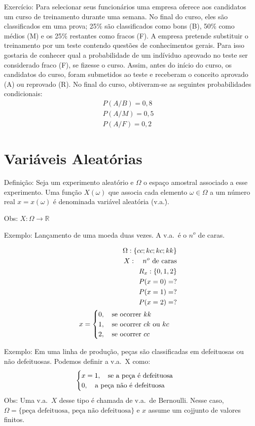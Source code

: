 \documentclass[11pt,a4paper]{article}
\begin{document}
Exercício: Para selecionar seus funcionários uma empresa oferece aos candidatos 
um curso de treinamento durante uma semana. No final do curso, eles são classificados
em uma prova; 25\% são classificados como bons (B), 50\% como médios (M) e os 
25\% restantes como fracos (F). A empresa pretende substituir o treinamento por um teste 
contendo questões de conhecimentos gerais. Para isso gostaria de conhecer qual a 
probabilidade de um indíviduo aprovado no teste ser considerado fraco (F), se 
fizesse o curso. Assim, antes do início do curso, os candidatos do curso, foram 
submetidos ao teste e receberam o conceito aprovado (A) ou reprovado (R). No final 
do curso, obtiveram-se as seguintes probabilidades condicionais: 
\begin{align*}
  P(A/B)= 0,8\\
  P(A/M) = 0,5\\
  P(A/F)=0,2
\end{align*}
\section{Variáveis Aleatórias}
Definição: Seja um experimento aleatório e $\Omega$ o espaço amostral associado 
a esse experimento. Uma função $X(\omega)$ que associa cada elemento $\omega \in
\Omega$ a um número real $x=x(\omega)$ é denominada variável aleatória (v.a.\.). 
\begin{figure} 
\end{figure}
Obs: $X:\Omega \to \mathbb{R}$

Exemplo: Lançamento de uma moeda duas vezes. A v.a.\ é o $n^o$ de caras. 

\begin{align*}
  \Omega : \{ cc;kc;kc;kk \}\\
  X: \text{\quad $n^o$ de caras}\\
  R_x: \{0,1,2 \}\\
  P(x=0)=?\\
  P(x=1)=? \\
  P(x=2)=? \\
  x=
  \begin{cases}
    0, \text{\quad se ocorrer $kk$} \\
    1, \text{\quad se ocorrer $ck$ ou $kc$} \\
    2,\text{\quad se ocorrer $cc$}
  \end{cases}
\end{align*}

Exemplo: Em uma linha de produção, peças são classificadas em defeituosas ou não
defeituosas. Podemos definir a v.a.\ X como:
\begin{align*}
  \begin{cases}
    x=1,\text{\quad  se a peça é defeituosa}\\ 
    0,\text{\quad  a peça não é defeituosa}
  \end{cases}
\end{align*}
Obs: Uma v.a.\ $X$ desse tipo é chamada de v.a.\ de Bernoulli. Nesse caso, $\Omega=\{ \text{peça defeituosa, peça não defeituosa} \}$
e $x$ assume um cojjunto de valores finitos.
\end{document}
